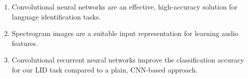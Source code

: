 \begin{enumerate}
	\item Convolutional neural networks are an effective, high-accuracy solution for language identification tasks.
	\item Spectrogram images are a suitable input representation for learning audio features.
	\item Convolutional recurrent neural networks improve the classification accuracy for our LID task compared to a plain, CNN-based approach.
\end{enumerate}


